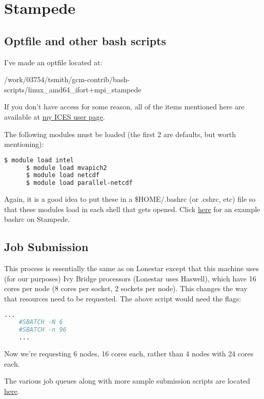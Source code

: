 \documentclass[a4paper,11pt]{article}
\begin{document}
\section{Stampede}

	\subsection{Optfile and other bash scripts}
	
	I've made an optfile located at: 
	
	/work/03754/tsmith/gcm-contrib/bash-scripts/linux\_amd64\_ifort+mpi\_stampede

	If you don't have access for some reason, all of the items mentioned here are available at \href{http://users.ices.utexas.edu/~tsmith/bash-scripts/}{my ICES user page}.

	The following modules must be loaded (the first 2 are defaults, but worth mentioning): 

	\begin{lstlisting}[language=bash]
	  $ module load intel
	  $ module load mvapich2
	  $ module load netcdf
	  $ module load parallel-netcdf
	\end{lstlisting}

	Again, it is a good idea to put these in a \$HOME/.bashrc (or .cshrc, etc) file so that these modules load in each shell that gets opened. Click \href{http://users.ices.utexas.edu/~tsmith/bash-scripts/bashrc_tsmith_stampede}{here} for an example bashrc on Stampede.


	\subsection{Job Submission}

	This process is essentially the same as on Lonestar except that this machine uses (for our purposes) Ivy Bridge processors (Lonestar uses Haswell), which have 16 cores per node (8 cores per socket, 2 sockets per node). This changes the way that resources need to be requested. The above script would need the flags: 

	\begin{lstlisting}[language=bash]
	...
	#SBATCH -N 6
	#SBATCH -n 96
	...

	\end{lstlisting} 

	Now we're requesting 6 nodes, 16 cores each, rather than 4 nodes with 24 cores each. 

	The various job queues along with more sample submission scripts are located \href{https://portal.tacc.utexas.edu/user-guides/stampede#running}{here}.  
\end{document}
